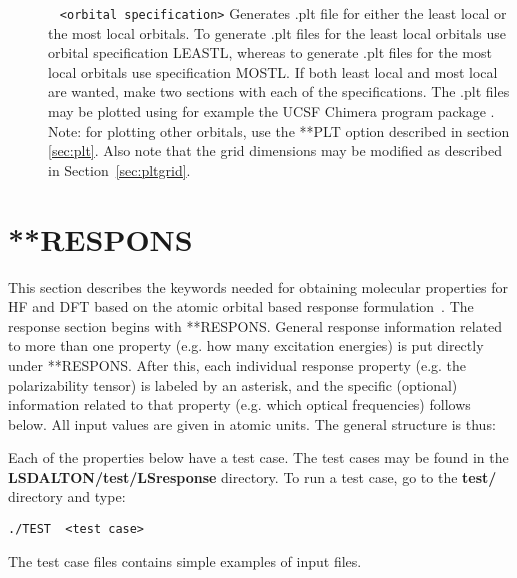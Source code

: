 \begin{description}
\item[]\verb| | \newline
\verb|<orbital specification>|\newline	
Generates .plt file for either the least local or the most local orbitals. To generate .plt files for the least local orbitals use orbital specification   LEASTL, whereas to generate .plt files for the most local orbitals use specification MOSTL. If both least local and most local are wanted, make two  sections with each of the specifications. The .plt files may be plotted using for example the UCSF Chimera program package \cite{chimera}. Note: for plotting other orbitals, use the **PLT option described in section \ref{sec:plt}. Also note that the grid dimensions may be modified as described in Section~\ref{sec:pltgrid}.
\end{description}




\section{**RESPONS}\label{subsec:respons}
This section describes the keywords needed for obtaining molecular
properties for HF and DFT based on the atomic orbital based response formulation~\cite{thorvaldsen:214108}.
The response section begins with
**RESPONS. 
General response information related to more than one property
(e.g. how many excitation energies)
is put directly under **RESPONS.
After this,
each individual response property (e.g. the polarizability tensor)
is labeled by an asterisk, and the specific (optional) information related
to that property (e.g. which optical frequencies) follows 
below.
All input values are given in atomic units.
The general structure is thus:
\begin{description}
\item[]
\item[]
\item[]
\item[]
\item[]
\item[]
\end{description}
Each of the properties below have a test case.
The test cases may be found in the {\bf LSDALTON/test/LSresponse} directory.
To run a test case, go to the
{\bf test/} directory and type: 
\begin{description}
\item
\verb|./TEST  <test case>|
\end{description}
The test case files contains simple examples of input files.

